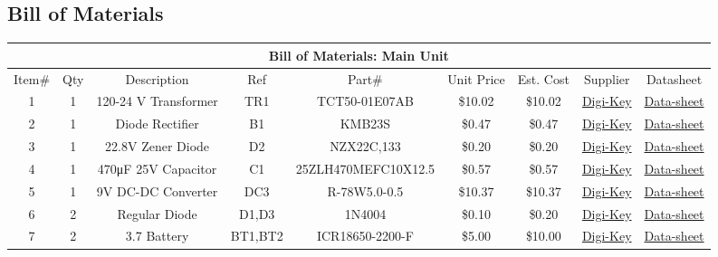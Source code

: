 \begin{landscape}
\section{Bill of Materials}
\begin{center}
  \begin{table}[h]
    \addtocounter{table}{-1}
  \begin{longtable}[c]{|c|c|c|c|c|c|c|c|c|}
    \hline
    \multicolumn{9}{|c|}{Bill of Materials: Main Unit}\\
    \hline
    Item\#&Qty&Description&Ref&Part\#&Unit Price&Est. Cost&Supplier&Datasheet\\
    \hline
    1&1&120-24 \si{\V} Transformer&TR1&TCT50-01E07AB&\$10.02&\$10.02&\href{https://www.digikey.com/en/products/detail/triad-magnetics/TCT50-01E07AB/2688350}{Digi-Key}&\href{http://catalog.triadmagnetics.com/Asset/TCT50-01E07AB.pdf}{Data-sheet}\\
    \hline
    2&1&Diode Rectifier&B1&KMB23S&\$0.47&\$0.47&\href{https://www.digikey.com/en/products/detail/smc-diode-solutions/KMB23S/7898339}{Digi-Key}&\href{https://www.smc-diodes.com/propdf/KMB22S\%20THRU\%20KMB220S\%20N1952\%20REV.B.pdf}{Data-sheet}\\
    \hline
    3&1&22.8\si{\V} Zener Diode&D2&NZX22C,133&\$0.20&\$0.20&\href{https://www.digikey.com/en/products/detail/nexperia-usa-inc/NZX22C-133/2296288}{Digi-Key}&\href{https://assets.nexperia.com/documents/data-sheet/NZX_SER.pdf}{Data-sheet}\\
    \hline
    4&1&470\si{\micro\farad} 25\si{\V} Capacitor&C1&25ZLH470MEFC10X12.5&\$0.57&\$0.57&\href{https://www.digikey.com/en/products/detail/rubycon/25ZLH470MEFC10X12-5/3563614}{Digi-Key}&\href{https://www.rubycon.co.jp/wp-content/uploads/catalog-aluminum/ZLH.pdf}{Data-sheet}\\
    \hline
    5&1&9\si{\V} DC-DC Converter&DC3&R-78W5.0-0.5&\$10.37&\$10.37&\href{https://www.digikey.com/en/products/detail/recom-power/R-78W9-0-0-5/4930587?s=N4IgTCBcDaIEoFoDsAOA6gTgHQAYE6wFYQBdAXyA}{Digi-Key}&\href{https://recom-power.com/pdf/Innoline/R-78W-0.5.pdf}{Data-sheet}\\
    \hline
    6&2&Regular Diode&D1,D3&1N4004&\$0.10&\$0.20&\href{https://www.digikey.com/en/products/detail/nte-electronics-inc/1N4004/11645015}{Digi-Key}&\href{https://www.digikey.com/en/products/detail/nte-electronics-inc/1N4004/11645015}{Data-sheet}\\
    \hline
    7&2&3.7 Battery&BT1,BT2&ICR18650-2200-F&\$5.00&\$10.00&\href{https://www.digikey.com/en/products/detail/pkcell/ICR18650-2200-F/11629982?s=N4IgTCBcDaIJIGEBKBGAHANgKwAYC0YYO\%2BAYiALoC\%2BQA}{Digi-Key}&\href{https://media.digikey.com/pdf/Data\%20Sheets/FusPower\%20PDF's/ICR18650_2200.pdf}{Data-sheet}\\

\end{longtable}
\end{table}
\end{center}
\end{landscape}
